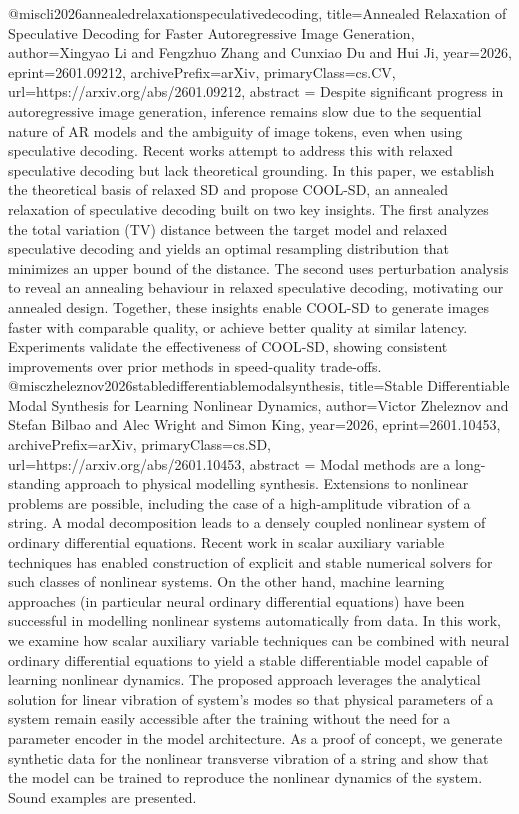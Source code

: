 {}@misc{li2026annealedrelaxationspeculativedecoding,
      title={Annealed Relaxation of Speculative Decoding for Faster Autoregressive Image Generation}, 
      author={Xingyao Li and Fengzhuo Zhang and Cunxiao Du and Hui Ji},
      year={2026},
      eprint={2601.09212},
      archivePrefix={arXiv},
      primaryClass={cs.CV},
      url={https://arxiv.org/abs/2601.09212},
      abstract = {Despite significant progress in autoregressive image generation, inference remains slow due to the sequential nature of AR models and the ambiguity of image tokens, even when using speculative decoding. Recent works attempt to address this with relaxed speculative decoding but lack theoretical grounding. In this paper, we establish the theoretical basis of relaxed SD and propose COOL-SD, an annealed relaxation of speculative decoding built on two key insights. The first analyzes the total variation (TV) distance between the target model and relaxed speculative decoding and yields an optimal resampling distribution that minimizes an upper bound of the distance. The second uses perturbation analysis to reveal an annealing behaviour in relaxed speculative decoding, motivating our annealed design. Together, these insights enable COOL-SD to generate images faster with comparable quality, or achieve better quality at similar latency. Experiments validate the effectiveness of COOL-SD, showing consistent improvements over prior methods in speed-quality trade-offs.}
}@misc{zheleznov2026stabledifferentiablemodalsynthesis,
      title={Stable Differentiable Modal Synthesis for Learning Nonlinear Dynamics}, 
      author={Victor Zheleznov and Stefan Bilbao and Alec Wright and Simon King},
      year={2026},
      eprint={2601.10453},
      archivePrefix={arXiv},
      primaryClass={cs.SD},
      url={https://arxiv.org/abs/2601.10453},
      abstract = {Modal methods are a long-standing approach to physical modelling synthesis. Extensions to nonlinear problems are possible, including the case of a high-amplitude vibration of a string. A modal decomposition leads to a densely coupled nonlinear system of ordinary differential equations. Recent work in scalar auxiliary variable techniques has enabled construction of explicit and stable numerical solvers for such classes of nonlinear systems. On the other hand, machine learning approaches (in particular neural ordinary differential equations) have been successful in modelling nonlinear systems automatically from data. In this work, we examine how scalar auxiliary variable techniques can be combined with neural ordinary differential equations to yield a stable differentiable model capable of learning nonlinear dynamics. The proposed approach leverages the analytical solution for linear vibration of system's modes so that physical parameters of a system remain easily accessible after the training without the need for a parameter encoder in the model architecture. As a proof of concept, we generate synthetic data for the nonlinear transverse vibration of a string and show that the model can be trained to reproduce the nonlinear dynamics of the system. Sound examples are presented.}
}
